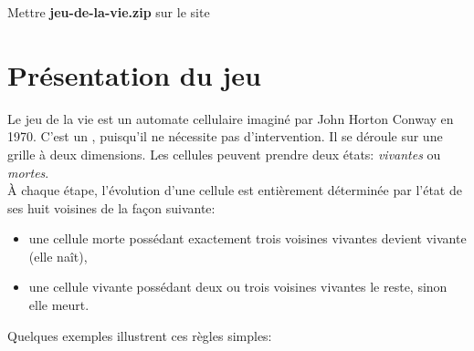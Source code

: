 \documentclass[a4paper,11pt]{article}
\begin{document}
\begin{Form}
\begin{commentprof}
Mettre \textbf{jeu-de-la-vie.zip} sur le site
\end{commentprof}
\section{Présentation du jeu}
Le jeu de la vie est un automate cellulaire imaginé par John Horton Conway en 1970. C'est un , puisqu'il ne nécessite pas d'intervention. Il se déroule sur une grille à deux dimensions. Les cellules peuvent prendre deux états: \emph{vivantes} ou \emph{mortes}.\\
À chaque étape, l’évolution d’une cellule est entièrement déterminée par l’état de ses huit voisines de la façon suivante:
\begin{itemize}
\item une cellule morte possédant exactement trois voisines vivantes devient vivante (elle naît),
\item une cellule vivante possédant deux ou trois voisines vivantes le reste, sinon elle meurt.
\end{itemize}
Quelques exemples illustrent ces règles simples:
\begin{center}
\end{center}
\begin{center}
\end{center}
\begin{center}
\end{center}

\end{Form}
\end{document}
